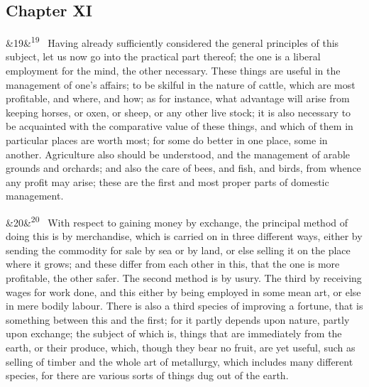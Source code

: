 \documentclass[12pt]{article}
\newcommand{\para}[1][]{\par\noindent\ifx&#1&\else\textsuperscript{\footnotesize #1}~\fi}
\begin{document}
\subsection*{Chapter XI}

\para[19] Having already sufficiently considered the general principles of this subject, let us now go into the practical part thereof; the one is a liberal employment for the mind, the other necessary. These things are useful in the management of one's affairs; to be skilful in the nature of cattle, which are most profitable, and where, and how; as for instance, what advantage will arise from keeping horses, or oxen, or sheep, or any other live stock; it is also necessary to be acquainted with the comparative value of these things, and which of them in particular places are worth most; for some do better in one place, some in another. Agriculture also should be understood, and the management of arable grounds and orchards; and also the care of bees, and fish, and birds, from whence any profit may arise; these are the first and most proper parts of domestic management.

\para[20] With respect to gaining money by exchange, the principal method of doing this is by merchandise, which is carried on in three different ways, either by sending the commodity for sale by sea or by land, or else selling it on the place where it grows; and these differ from each other in this, that the one is more profitable, the other safer. The second method is by usury. The third by receiving wages for work done, and this either by being employed in some mean art, or else in mere bodily labour. There is also a third species of improving a fortune, that is something between this and the first; for it partly depends upon nature, partly upon exchange; the subject of which is, things that are immediately from the earth, or their produce, which, though they bear no fruit, are yet useful, such as selling of timber and the whole art of metallurgy, which includes many different species, for there are various sorts of things dug out of the earth.
\end{document}
